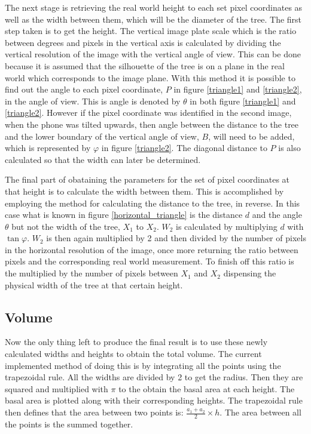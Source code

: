 The next stage is retrieving the real world height to each set pixel coordinates 
as well as the width between them, which will be the diameter of the tree. The 
first step taken is to get the height. The vertical image plate scale which is 
the ratio between degrees and pixels in the vertical axis is calculated by 
dividing the vertical resolution of the image with the vertical angle of view. 
This can be done because it is assumed that the silhouette of the tree is on a
plane in the real world which corresponds to the image plane. With this method 
it is possible to find out the angle to each pixel coordinate, $P$ in figure 
\ref{triangle1} and \ref{triangle2}, in the angle of view. This is angle is 
denoted by $\theta$ in both figure \ref{triangle1} and \ref{triangle2}. However 
if the pixel coordinate was identified in the second image, when the phone was 
tilted upwards, then angle between the distance to the tree and the lower boundary
of the vertical angle of view, $B$, will need to be added, which is represented
by $\varphi$ in figure \ref{triangle2}. The diagonal distance to $P$ is also 
calculated so that the width can later be determined.

The final part of obataining the parameters for the set of pixel coordinates at 
that height is to calculate the width between them. This is accomplished by 
employing the method for calculating the distance to the tree, in reverse. 
In this case what is known in figure \ref{horizontal_triangle} is the distance 
$d$ and the angle $\theta$ but not the width of the tree, $X_1$ to $X_2$. $W_2$ 
is calculated by multiplying $d$ with $\tan{\varphi}$. $W_2$ is then again 
multiplied by 2 and then divided by the number of pixels in the horizontal 
resolution of the image, once more returning the ratio between pixels and the 
corresponding real world measurement. To finish off this ratio is the multiplied
by the number of pixels between $X_1$ and $X_2$ dispensing the physical width
of the tree at that certain height.


\subsection{Volume}
Now the only thing left to produce the final result is to use these newly 
calculated widths and heights to obtain the total volume. The current implemented 
method of doing this is by integrating all the points using the trapezoidal rule.
All the widths are divided by 2 to get the radius. Then they are squared and
multiplied with $\pi$ to the obtain the basal area at each height. The basal 
area is plotted along with their corresponding heights. The trapezoidal rule 
then defines that the area between two points is: $\frac{a_1 + a_2}{2} \times h$.
The area between all the points is the summed together.


